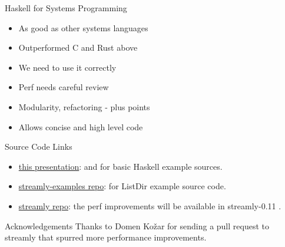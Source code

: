 \documentclass[17pt]{beamer}
\begin{document}
\begin{frame}{Haskell for Systems Programming}{}
\begin{itemize}
  \item As good as other systems languages
  \item Outperformed C and Rust above
  \item We need to use it correctly
  \item Perf needs careful review
  \item Modularity, refactoring - plus points
  \item Allows concise and high level code
\end{itemize}
\end{frame}

\begin{frame}{Source Code Links}
\begin{itemize}
\item
\href{https://github.com/composewell/fnconf-2025-directory-traversal}
  {this presentation}: and for basic Haskell example sources.
\item
  \href{https://github.com/composewell/streamly-examples/blob/aec56f4e4481e97330aa5ce4324cd1a2d2b3c2bd/examples/ListDir.hs}
    {streamly-examples repo}: for ListDir example source code.
\item \href{https://github.com/composewell/streamly}{streamly repo}:
  the perf improvements will be available in streamly-0.11 .
  \end{itemize}
\end{frame}

\begin{frame}{Acknowledgements}
  Thanks to Domen Kožar for sending a pull request to streamly that spurred
  more performance improvements.
\end{frame}

\begin{frame}{}
\end{frame}

\end{document}
